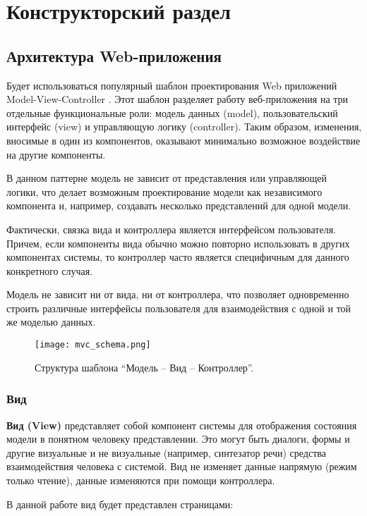 \chapter{Конструкторский раздел}

\section{Архитектура Web-приложения}
Будет использоваться популярный шаблон проектирования Web приложений Model-View-Controller \cite{wiki-mvc}. Этот шаблон разделяет работу веб-приложения на три отдельные функциональные роли: модель данных (model), пользовательский интерфейс (view) и управляющую логику (controller). Таким образом, изменения, вносимые в один из компонентов, оказывают минимально возможное воздействие на другие компоненты.

В данном паттерне модель не зависит от представления или управляющей логики, что делает возможным проектирование модели как независимого компонента и, например, создавать несколько представлений для одной модели.

Фактически, связка вида и контроллера является интерфейсом пользователя. Причем, если компоненты вида обычно можно повторно использовать в других компонентах системы, то контроллер часто является специфичным для данного конкретного случая.

Модель не зависит ни от вида, ни от контроллера, что позволяет одновременно строить различные интерфейсы пользователя для взаимодействия с одной и той же моделью данных.

\begin{figure}[h]
  \centering
  \texttt{[image: mvc\_schema.png]}
  \caption{ Структура шаблона “Модель – Вид – Контроллер”.}
\end{figure}

\subsection{Вид}

\textbf{Вид (View)} представляет собой компонент системы для отображения состояния модели в понятном человеку представлении. Это могут быть диалоги, формы и другие визуальные и не визуальные (например, синтезатор речи) средства взаимодействия человека с системой. Вид не изменяет данные напрямую (режим только чтение), данные изменяются при помощи контроллера.

В данной работе вид будет представлен страницами:

